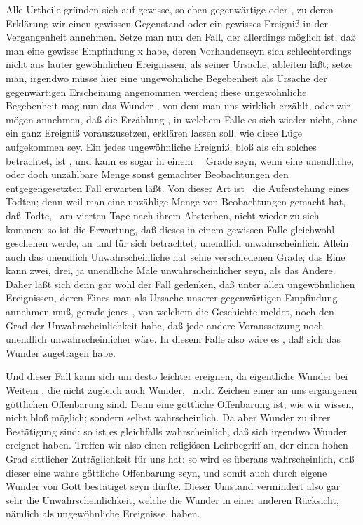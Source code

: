 \begin{aufza}
\begin{aufzb}
\item  Alle  Urtheile gründen sich auf gewisse, so eben gegenwärtige  oder , zu deren Erklärung wir einen gewissen Gegenstand oder ein gewisses Ereigniß in der Vergangenheit annehmen. Setze man nun den Fall, der allerdings möglich ist, daß man eine gewisse Empfindung x habe, deren Vorhandenseyn sich schlechterdings nicht aus lauter gewöhnlichen Ereignissen, als seiner Ursache, ableiten läßt; setze man, irgendwo müsse hier eine ungewöhnliche Begebenheit als Ursache der gegenwärtigen Erscheinung angenommen werden; diese ungewöhnliche Begebenheit mag nun das Wunder , von dem man uns wirklich erzählt, oder wir mögen annehmen, daß die Erzählung , in welchem Falle es sich wieder nicht, ohne ein ganz  Ereigniß vorauszusetzen, erklären lassen soll, wie diese Lüge aufgekommen sey. Ein jedes ungewöhnliche Ereigniß, bloß als ein solches betrachtet, ist , und kann es sogar in einem~\   Grade seyn, wenn eine unendliche, oder doch unzählbare Menge sonst gemachter Beobachtungen den entgegengesetzten Fall erwarten läßt. Von dieser Art ist \zB\ die Auferstehung eines Todten; denn weil man eine unzählige Menge von Beobachtungen gemacht hat, daß Todte, \zB\ am vierten Tage nach ihrem Absterben, nicht wieder zu sich kommen: so ist die Erwartung, daß dieses in einem gewissen Falle gleichwohl geschehen werde, an und für sich betrachtet, unendlich unwahrscheinlich. Allein auch das unendlich Unwahrscheinliche hat seine verschiedenen Grade; das Eine kann zwei, drei, ja unendliche Male unwahrscheinlicher seyn, als das Andere. Daher läßt sich denn gar wohl der Fall gedenken, daß unter allen ungewöhnlichen Ereignissen, deren Eines man als Ursache unserer gegenwärtigen Empfindung annehmen muß, gerade jenes , von welchem die Geschichte meldet, noch den  Grad der Unwahrscheinlichkeit habe, daß jede andere Voraussetzung noch unendlich unwahrscheinlicher wäre. In diesem Falle also wäre es , daß sich das Wunder zugetragen habe.
\item  Und dieser Fall kann sich um desto leichter ereignen, da eigentliche Wunder bei Weitem , die nicht zugleich auch Wunder, \dh\ nicht Zeichen einer an uns ergangenen göttlichen Offenbarung sind. Denn eine göttliche Offenbarung ist, wie wir wissen, nicht bloß möglich; sondern selbst wahrscheinlich. Da aber Wunder zu ihrer Bestätigung  sind: so ist es gleichfalls wahrscheinlich, daß sich irgendwo Wunder ereignet haben. Treffen wir also einen religiösen Lehrbegriff an, der einen hohen Grad sittlicher Zuträglichkeit für uns hat: so wird es überaus wahrscheinlich, daß dieser eine wahre göttliche Offenbarung seyn, und somit auch durch eigene Wunder von Gott bestätiget seyn dürfte. Dieser Umstand vermindert also gar sehr die Unwahrscheinlichkeit, welche die Wunder in einer anderen Rücksicht, nämlich als ungewöhnliche Ereignisse, haben.

\end{aufzb}
\end{aufza}
